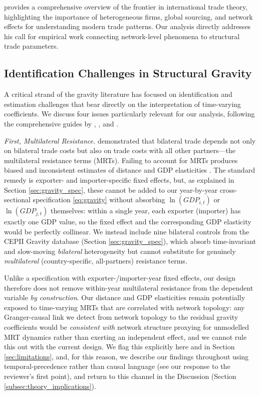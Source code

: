 \documentclass[preprint, 3p,
authoryear]{elsarticle} %
\begin{document}
\citet{antras2025uncharted} provides a comprehensive overview of the
frontier in international trade theory, highlighting the importance of
heterogeneous firms, global sourcing, and network effects for
understanding modern trade patterns. Our analysis directly addresses his
call for empirical work connecting network-level phenomena to structural
trade parameters.

\subsection{Identification Challenges in Structural
Gravity}\label{subsec:identification}

A critical strand of the gravity literature has focused on
identification and estimation challenges that bear directly on the
interpretation of time-varying coefficients. We discuss four issues
particularly relevant for our analysis, following the comprehensive
guides by \citet{headmayer2014}, \citet{yotov2024evolution}, and
\citet{larch2025estimating}.

\textit{First, Multilateral Resistance.} \citet{anderson2003}
demonstrated that bilateral trade depends not only on bilateral trade
costs but also on trade costs with all other partners---the multilateral
resistance terms (MRTs). Failing to account for MRTs produces biased and
inconsistent estimates of distance and GDP elasticities
\citep{headmayer2014, yotov2024evolution}. The standard remedy is
exporter- and importer-specific fixed effects, but, as explained in
Section \ref{sec:gravity_spec}, these cannot be added to our
year-by-year cross-sectional specification \eqref{eq:gravity} without
absorbing \(\ln(GDP_{i,t})\) or \(\ln(GDP_{j,t})\) themselves: within a
single year, each exporter (importer) has exactly one GDP value, so the
fixed effect and the corresponding GDP elasticity would be perfectly
collinear. We instead include nine bilateral controls from the CEPII
Gravity database \citep{conte2022cepii} (Section
\ref{sec:gravity_spec}), which absorb time-invariant and slow-moving
\textit{bilateral} heterogeneity but cannot substitute for genuinely
\textit{multilateral} (country-specific, all-partners) resistance terms.

Unlike a specification with exporter-/importer-year fixed effects, our
design therefore does not remove within-year multilateral resistance
from the dependent variable \textit{by construction}. Our distance and
GDP elasticities remain potentially exposed to time-varying MRTs that
are correlated with network topology: any Granger-causal link we detect
from network topology to the residual gravity coefficients would be
\textit{consistent with} network structure proxying for unmodelled MRT
dynamics rather than exerting an independent effect, and we cannot rule
this out with the current design. We flag this explicitly here and in
Section \ref{sec:limitations}, and, for this reason, we describe our
findings throughout using temporal-precedence rather than causal
language (see our response to the reviewer's first point), and return to
this channel in the Discussion (Section
\ref{subsec:theory_implications}).
\end{document}
